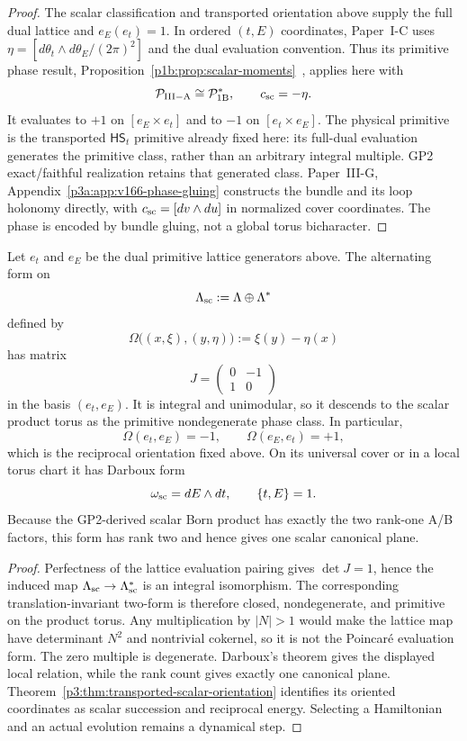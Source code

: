 \documentclass[12pt,a4paper]{article}
\begin{document}
\begin{proof}
The scalar classification and transported orientation above supply
the full dual lattice and $e_E(e_t)=1$. In ordered $(t,E)$ coordinates,
Paper~I-C uses $\eta=[d\theta_t\wedge d\theta_E/(2\pi)^2]$ and the
dual evaluation convention. Thus its primitive phase result,
Proposition~\ref{p1b:prop:scalar-moments}~\cite{Kugelmann2026Paper1B},
applies here with
\[
 \mathcal P_{\mathrm{III-A}}\cong\mathcal P_{\mathrm{1B}}^*,
 \qquad c_{\rm sc}=-\eta.
\]
It evaluates to $+1$ on $[e_E\times e_t]$ and to $-1$ on
$[e_t\times e_E]$. The physical primitive is the transported
$\mathsf{HS}_t$ primitive already fixed here: its full-dual evaluation
generates the primitive class, rather than an arbitrary integral multiple.
GP2 exact/faithful realization retains that generated class.
Paper~III-G, Appendix~\ref{p3a:app:v166-phase-gluing} constructs the bundle and its
loop holonomy directly, with \(c_{\rm sc}=[dv\wedge du]\) in normalized
cover coordinates. The phase is encoded by bundle gluing, not a global
torus bicharacter.
\end{proof}

\begin{theorem}
\label{p3:thm:minimal-symplectic-completion}
Let \(e_t\) and \(e_E\) be the dual primitive lattice generators above.  The
alternating form on
\[
        \Lambda_{\rm sc}:=\Lambda\oplus\Lambda^*
\]
defined by
\[
        \Omega\bigl((x,\xi),(y,\eta)\bigr)
        :=\xi(y)-\eta(x)
\]
has matrix
\[
        J=
        \begin{pmatrix}0&-1\\[2pt]1&0\end{pmatrix}
\]
in the basis \((e_t,e_E)\).  It is integral and unimodular, so it descends to
the scalar product torus as the primitive nondegenerate phase class.  In
particular,
\[
 \Omega(e_t,e_E)=-1,
 \qquad
 \Omega(e_E,e_t)=+1,
\]
which is the reciprocal orientation fixed above.  On its
universal cover or in a local torus chart it has Darboux form
\[
        \omega_{\rm sc}=dE\wedge dt,
        \qquad
        \{t,E\}=1.
\]
Because the GP2-derived scalar Born product has exactly the two rank-one A/B factors, this form has rank two and hence gives one scalar canonical plane.
\end{theorem}

\begin{proof}
Perfectness of the lattice evaluation pairing gives
\(\det J=1\), hence the induced map
\(\Lambda_{\rm sc}\to\Lambda_{\rm sc}^*\) is an integral isomorphism.  The
corresponding translation-invariant two-form is therefore closed,
nondegenerate, and primitive on the product torus.  Any multiplication by
\(|N|>1\) would make the lattice map have determinant \(N^2\) and nontrivial
cokernel, so it is not the Poincar\'e evaluation form.  The zero multiple is
degenerate.  Darboux's theorem gives the displayed local relation, while the
rank count gives exactly one canonical plane.
Theorem~\ref{p3:thm:transported-scalar-orientation} identifies its oriented
coordinates as scalar succession and reciprocal energy.  Selecting a
Hamiltonian and an actual evolution remains a dynamical step.
\end{proof}
\end{document}

